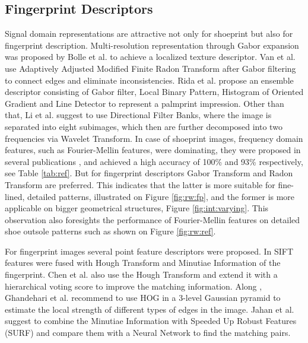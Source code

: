 \documentclass[draft,final]{vutinfth} %
\begin{document}
\subsection{Fingerprint Descriptors}
\par
Signal domain representations are attractive not only for shoeprint but also for fingerprint description.
Multi-resolution representation through Gabor expansion was proposed by Bolle et al. \cite{bolle2012fingerprint} to achieve a localized texture descriptor.
Van et al. \cite{van2016fingerprint} use Adaptively Adjusted Modified Finite Radon Transform after Gabor filtering to connect edges and eliminate inconsistencies.
Rida et al. \cite{rida2018palmprint} propose an ensemble descriptor consisting of Gabor filter, Local Binary Pattern, Histogram of Oriented Gradient and Line Detector to represent a palmprint impression.
Other than that, Li et al. \cite{li2012texture} suggest to use Directional Filter Banks, where the image is separated into eight subimages, which then are further decomposed into two frequencies via Wavelet Transform.
In case of shoeprint images, frequency domain features, such as Fourier-Mellin features, were dominating, they were proposed in several publications  \cite{gueham2007automatic}, \cite{wu2019crime} and achieved a high accuracy of 100\% and 93\% respectively, see Table \ref{tab:ref}.
But for fingerprint descriptors Gabor Transform and Radon Transform are preferred.
This indicates that the latter is more suitable for fine-lined, detailed patterns, illustrated on Figure \ref{fig:rw:fp}, and the former is more applicable on bigger geometrical structures, Figure \ref{fig:int:varying}.
This observation also foresights the performance of Fourier-Mellin features on detailed shoe outsole patterns such as shown on Figure \ref{fig:rw:ref}. 
\par
For fingerprint images several point feature descriptors were proposed.
In \cite{zhou2011adaptive} SIFT \cite{lowe1999object} features were fused with Hough Transform and Minutiae Information of the fingerprint.
Chen et al. \cite{chen2013hierarchical} also use the Hough Transform and extend it with a hierarchical voting score to improve the matching information. 
Along  \cite{rida2018palmprint}, Ghandehari et al. \cite{ghandehari2012palmprint} recommend to use HOG in a 3-level Gaussian pyramid to estimate the local strength of different types of edges in the image.
Jahan et al. \cite{jahan2017robust} suggest to combine the Minutiae Information with Speeded Up Robust Features (SURF) and compare them with a Neural Network to find the matching pairs.
\end{document}
